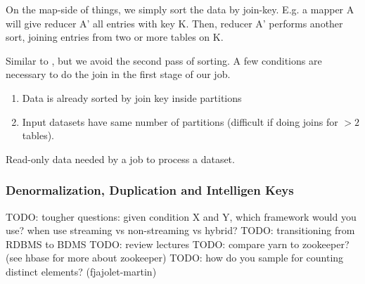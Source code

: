 \begin{definition}\label{def:reducejoin}
    On the map-side of things, we simply sort the data by join-key. E.g. a mapper A
    will give reducer A' all entries with key K. Then, reducer A' performs another sort,
    joining entries from two or more tables on K.
\end{definition}


\begin{definition}\label{def:mapjoin}
    Similar to , but we avoid the second pass of sorting.
    A few conditions are necessary to do the join in the first stage of our job.
    \begin{enumerate}
        \item Data is already sorted by join key inside partitions
        \item Input datasets have same number of partitions (difficult if doing joins 
            for $> 2$ tables).
    \end{enumerate}
\end{definition}

\begin{definition}\label{def:sidedata}
    Read-only data needed by a job to process a dataset.
\end{definition}


\subsubsection{Denormalization, Duplication and Intelligen Keys}\label{sec:DDI}
TODO: tougher questions: given condition X and Y, which framework would you use?
    when use streaming vs non-streaming vs hybrid?
TODO: transitioning from RDBMS to BDMS
TODO: review lectures
TODO:  compare yarn to zookeeper? (see hbase for more about zookeeper)
TODO:  how do you sample for counting distinct elements?
    (fjajolet-martin)
